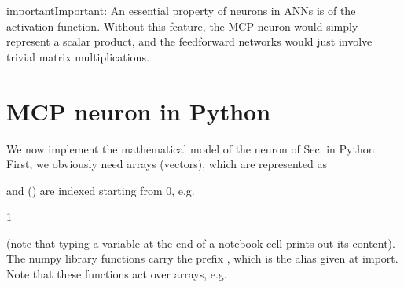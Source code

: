 \documentclass[letterpaper,10pt,english]{jupyterBook}
\begin{document}
\begin{sphinxadmonition}{important}{Important:}
\sphinxAtStartPar
An essential property of neurons in ANNs is  of the activation function. Without this feature, the MCP neuron would simply represent a scalar product, and the feed\sphinxhyphen{}forward networks would just involve trivial matrix multiplications.
\end{sphinxadmonition}


\section{MCP neuron in Python}
\label{\detokenize{docs/mcp:mcp-neuron-in-python}}\label{\detokenize{docs/mcp:mcp-p-lab}}
\sphinxAtStartPar
We now implement the mathematical model of the neuron of Sec. {\hyperref[\detokenize{docs/mcp:mcp-lab}]{}} in Python. First, we obviously need arrays (vectors), which are represented as

\begin{sphinxVerbatim}[commandchars=\\\{\}]
  \PYG{p}{[}\PYG{p}{]}
  \PYG{p}{[}\PYG{p}{]}
\end{sphinxVerbatim}

\sphinxAtStartPar
and () are indexed starting from 0, e.g.

\begin{sphinxVerbatim}[commandchars=\\\{\}]
\PYG{p}{[}\PYG{p}{]}
\end{sphinxVerbatim}

\begin{sphinxVerbatim}[commandchars=\\\{\}]
1
\end{sphinxVerbatim}

\sphinxAtStartPar
(note that typing a variable at the end of a notebook cell prints out its content). The numpy library functions carry the prefix , which is the alias given at import. Note that these functions act  over arrays, e.g.

\begin{sphinxVerbatim}[commandchars=\\\{\}]
\end{sphinxVerbatim}
\end{document}
